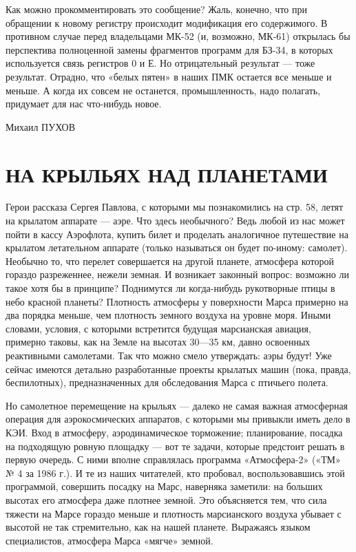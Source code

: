 \documentclass[11pt,a4paper,oneside]{article}
\begin{document}
Как можно прокомментировать это сообщение? Жаль, конечно, что при обращении к новому регистру происходит модификация его содержимого. В противном случае перед владельцами МК-52 (и, возможно, МК-61) открылась бы перспектива полноценной замены фрагментов программ для БЗ-34, в которых используется связь регистров 0 и Е. Но отрицательный результат — тоже результат. Отрадно, что «белых пятен» в наших ПМК остается все меньше и меньше. А когда их совсем не останется, промышленность, надо полагать, придумает для нас что-нибудь новое.

Михаил ПУХОВ

\section{НА КРЫЛЬЯХ НАД ПЛАНЕТАМИ}

Герои рассказа Сергея Павлова, с которыми мы познакомились на стр. 58, летят на крылатом аппарате — аэре. Что здесь необычного? Ведь любой из нас может пойти в кассу Аэрофлота, купить билет и проделать аналогичное путешествие на крылатом летательном аппарате (только называться он будет по-иному: самолет). Необычно то, что перелет совершается на другой планете, атмосфера которой гораздо разреженнее, нежели земная. И возникает законный вопрос: возможно ли такое хотя бы в принципе? Поднимутся ли когда-нибудь рукотворные птицы в небо красной планеты?
Плотность атмосферы у поверхности Марса примерно на два порядка меньше, чем плотность земного воздуха на уровне моря. Иными словами, условия, с которыми встретится будущая марсианская авиация, примерно таковы, как на Земле на высотах 30—35 км, давно освоенных реактивными самолетами. Так что можно смело утверждать: аэры будут! Уже сейчас имеются детально разработанные проекты крылатых машин (пока, правда, беспилотных), предназначенных для обследования Марса с птичьего полета.

Но самолетное перемещение на крыльях — далеко не самая важная атмосферная операция для аэрокосмических аппаратов, с которыми мы привыкли иметь дело в КЭИ. Вход в атмосферу, аэродинамическое торможение; планирование, посадка на подходящую ровную площадку — вот те задачи, которые предстоит решать в первую очередь. С ними вполне справлялась программа «Атмосфера-2» («ТМ» № 4 за 1986 г.). И те из наших читателей, кто пробовал, воспользовавшись этой программой, совершить посадку на Марс, наверняка заметили: на больших высотах его атмосфера даже плотнее земной. Это объясняется тем, что сила тяжести на Марсе гораздо меньше и плотность марсианского воздуха убывает с высотой не так стремительно, как на нашей планете. Выражаясь языком специалистов, атмосфера Марса «мягче» земной.
\end{document}
